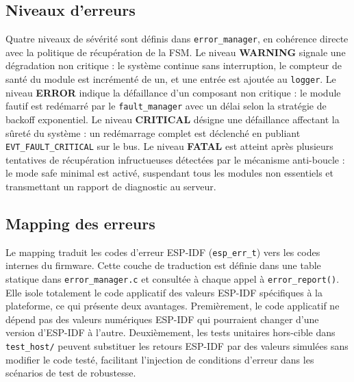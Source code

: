 \subsection{Niveaux d'erreurs}
\label{subsec:errlevels}

Quatre niveaux de sévérité sont définis dans \texttt{error\_manager},
en cohérence directe avec la politique de récupération de la FSM.
Le niveau \textbf{WARNING} signale une dégradation non critique :
le système continue sans interruption, le compteur de santé du module
est incrémenté de un, et une entrée est ajoutée au \texttt{logger}.
Le niveau \textbf{ERROR} indique la défaillance d'un composant non
critique : le module fautif est redémarré par le \texttt{fault\_manager}
avec un délai selon la stratégie de backoff exponentiel. Le niveau
\textbf{CRITICAL} désigne une défaillance affectant la sûreté du
système : un redémarrage complet est déclenché en publiant
\texttt{EVT\_FAULT\_CRITICAL} sur le bus. Le niveau \textbf{FATAL}
est atteint après plusieurs tentatives de récupération infructueuses
détectées par le mécanisme anti-boucle : le mode safe minimal est
activé, suspendant tous les modules non essentiels et transmettant
un rapport de diagnostic au serveur.

\subsection{Mapping des erreurs}
\label{subsec:errmapping}

Le mapping traduit les codes d'erreur ESP-IDF (\texttt{esp\_err\_t})
vers les codes internes du firmware. Cette couche de traduction est
définie dans une table statique dans \texttt{error\_manager.c} et
consultée à chaque appel à \texttt{error\_report()}. Elle isole
totalement le code applicatif des valeurs ESP-IDF spécifiques à la
plateforme, ce qui présente deux avantages. Premièrement, le code
applicatif ne dépend pas des valeurs numériques ESP-IDF qui pourraient
changer d'une version d'ESP-IDF à l'autre. Deuxièmement, les tests
unitaires hors-cible dans \texttt{test\_host/} peuvent substituer
les retours ESP-IDF par des valeurs simulées sans modifier le code
testé, facilitant l'injection de conditions d'erreur dans les
scénarios de test de robustesse.

